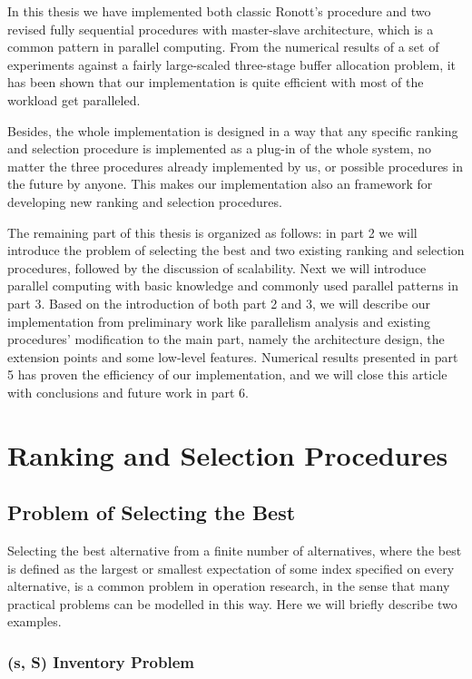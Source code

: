 \documentclass[12pt,a4]{report}
\begin{document}
In this thesis we have implemented both classic Ronott's procedure and two revised fully sequential procedures with master-slave architecture, which is a common pattern in parallel computing. From the numerical results of a set of experiments against a fairly large-scaled three-stage buffer allocation problem, it has been shown that our implementation is quite efficient with most of the workload get paralleled.

Besides, the whole implementation is designed in a way that any specific ranking and selection procedure is implemented as a plug-in of the whole system, no matter the three procedures already implemented by us, or possible procedures in the future by anyone. This makes our implementation also an framework for developing new ranking and selection procedures.

The remaining part of this thesis is organized as follows: in part 2 we will introduce the problem of selecting the best and two existing ranking and selection procedures, followed by the discussion of scalability. Next we will introduce parallel computing with basic knowledge and commonly used parallel patterns in part 3. Based on the introduction of both part 2 and 3, we will describe our implementation from preliminary work like parallelism analysis and existing procedures' modification to the main part, namely the architecture design, the extension points and some low-level features. Numerical results presented in part 5 has proven the efficiency of our implementation, and we will close this article with conclusions and future work in part 6.

\chapter{Ranking and Selection Procedures}

\section{Problem of Selecting the Best}

Selecting the best alternative from a finite number of alternatives, where the best is defined as the largest or smallest expectation of some index specified on every alternative, is a common problem in operation research, in the sense that many practical problems can be modelled in this way. Here we will briefly describe two examples.

\subsection{(s, S) Inventory Problem}
\end{document}
